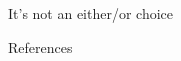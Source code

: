 \documentclass[12pt]{beamer}
\begin{document}
\begin{frame}{It's not an either/or choice}

\end{frame}

\begin{frame}{References}
  
  
\end{frame}
\end{document}
